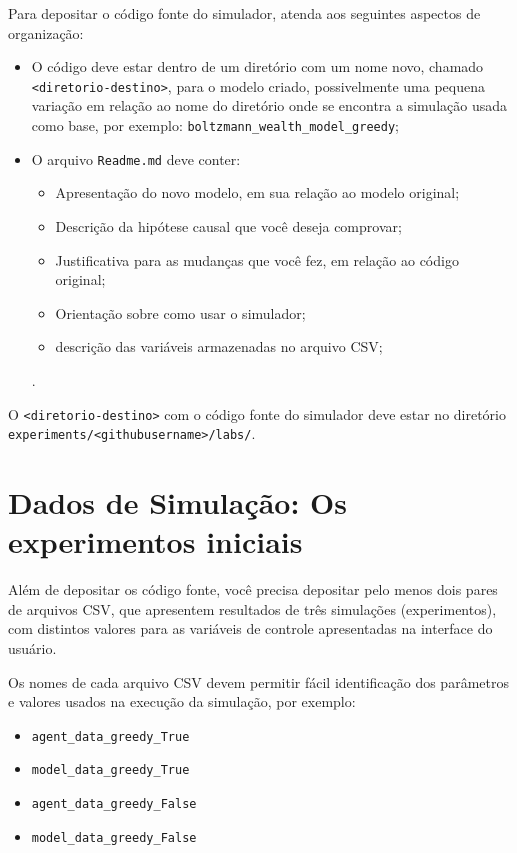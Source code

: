 Para depositar o código fonte do simulador, atenda aos seguintes aspectos de organização:
\begin{itemize}
    \item O código deve estar dentro de um diretório com um nome novo, chamado \verb|<diretorio-destino>|, para o modelo criado, possivelmente uma pequena variação em relação ao nome do diretório onde se encontra a simulação usada como base, por exemplo:
    \verb|boltzmann_wealth_model_greedy|;
    \item O arquivo \verb|Readme.md| deve conter:
    \begin{itemize}
        \item Apresentação do novo modelo, em sua relação ao modelo original;
        \item Descrição da hipótese causal que você deseja comprovar;
        \item Justificativa para as mudanças que você fez, em relação ao código original;
        \item Orientação sobre como usar o simulador;
        \item descrição das variáveis armazenadas no arquivo CSV;
    \end{itemize}.
\end{itemize}

O \verb|<diretorio-destino>| com o código fonte do simulador deve estar no diretório \verb|experiments/<githubusername>/labs/|.

\section{Dados de Simulação: Os experimentos iniciais}

Além de depositar os código fonte, você precisa depositar pelo menos dois pares de arquivos CSV, que apresentem resultados de três simulações (experimentos), com distintos valores para as variáveis de controle apresentadas na interface do usuário.

Os nomes de cada arquivo CSV devem permitir fácil identificação dos  parâmetros e valores usados na execução da simulação, por exemplo:
\begin{itemize}
    \item \verb|agent_data_greedy_True|
    \item \verb|model_data_greedy_True|
    \item \verb|agent_data_greedy_False|
    \item \verb|model_data_greedy_False|
\end{itemize}

